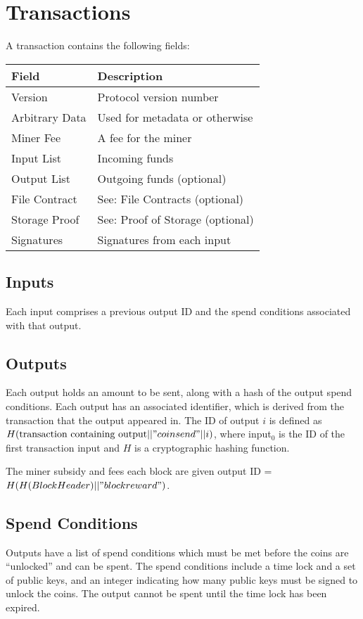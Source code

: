 \documentclass[twocolumn]{article}
\begin{document}
\section{Transactions}
A transaction contains the following fields:
\begin{tabular}{| l | l |}
	\hline
	\textbf{Field} & \textbf{Description} \\ \hline
	Version        & Protocol version number \\ \hline
	Arbitrary Data & Used for metadata or otherwise \\ \hline
	Miner Fee      & A fee for the miner \\ \hline
	Input List     & Incoming funds \\ \hline
	Output List    & Outgoing funds (optional) \\ \hline
	File Contract  & See: File Contracts (optional) \\ \hline
	Storage Proof  & See: Proof of Storage (optional) \\ \hline
	Signatures     & Signatures from each input \\ \hline
\end{tabular}

\subsection{Inputs}
Each input comprises a previous output ID and the spend conditions associated with that output.

\subsection{Outputs}
Each output holds an amount to be sent, along with a hash of the output spend conditions.
Each output has an associated identifier, which is derived from the transaction that the output appeared in.
The ID of output $i$ is defined as $H(\text{transaction containing output} || "coinsend" || i)$,
where input$_0$ is the ID of the first transaction input and $H$ is a cryptographic hashing function.

The miner subsidy and fees each block are given output ID = $H(H(Block Header) || "blockreward")$.

\subsection{Spend Conditions}
Outputs have a list of spend conditions which must be met before the coins are ``unlocked'' and can be spent.
The spend conditions include a time lock and a set of public keys, and an integer indicating how many public keys must be signed to unlock the coins.
The output cannot be spent until the time lock has been expired.
\end{document}
